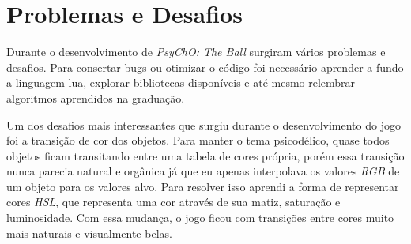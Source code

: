 \section{Problemas e Desafios}
\label{sec:problemas_e_desafios}

Durante o desenvolvimento de \textit{PsyChO: The Ball} surgiram vários problemas e desafios. Para consertar bugs ou otimizar o código foi necessário aprender a fundo a linguagem lua, explorar bibliotecas disponíveis e até mesmo relembrar algoritmos aprendidos na graduação.

Um dos desafios mais interessantes que surgiu durante o desenvolvimento do jogo foi a transição de cor dos objetos. Para manter o tema psicodélico, quase todos objetos ficam transitando entre uma tabela de cores própria, porém essa transição nunca parecia natural e orgânica já que eu apenas interpolava os valores \textit{RGB} de um objeto para os valores alvo. Para resolver isso aprendi a forma de representar cores \textit{HSL}, que representa uma cor através de sua matiz, saturação e luminosidade. Com essa mudança, o jogo ficou com transições entre cores muito mais naturais e visualmente belas.
